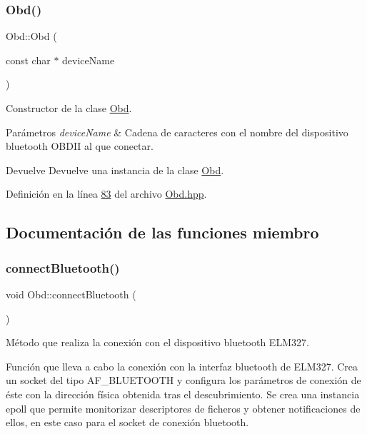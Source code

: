 \subsubsection{\texorpdfstring{Obd()}{Obd()}}
{\footnotesize\ttfamily Obd\+::\+Obd (\begin{DoxyParamCaption}\item[{const char $\ast$}]{device\+Name }\end{DoxyParamCaption})\hspace{0.3cm}{\ttfamily [inline]}}



Constructor de la clase \hyperlink{classObd}{Obd}. 


\begin{DoxyParams}{Parámetros}
{\em device\+Name} & Cadena de caracteres con el nombre del dispositivo bluetooth O\+B\+D\+II al que conectar. \\
\hline
\end{DoxyParams}
\begin{DoxyReturn}{Devuelve}
Devuelve una instancia de la clase \hyperlink{classObd}{Obd}. 
\end{DoxyReturn}


Definición en la línea \hyperlink{Obd_8hpp_source_l00083}{83} del archivo \hyperlink{Obd_8hpp_source}{Obd.\+hpp}.



\subsection{Documentación de las funciones miembro}
\mbox{\label{classObd_a104ccc3f2e0a4a103ae4cd1daa2f64d8}} 
\subsubsection{\texorpdfstring{connect\+Bluetooth()}{connectBluetooth()}}
{\footnotesize\ttfamily void Obd\+::connect\+Bluetooth (\begin{DoxyParamCaption}{ }\end{DoxyParamCaption})\hspace{0.3cm}{\ttfamily [inline]}}



Método que realiza la conexión con el dispositivo bluetooth E\+L\+M327. 

Función que lleva a cabo la conexión con la interfaz bluetooth de E\+L\+M327. Crea un socket del tipo A\+F\+\_\+\+B\+L\+U\+E\+T\+O\+O\+TH y configura los parámetros de conexión de éste con la dirección física obtenida tras el descubrimiento. Se crea una instancia epoll que permite monitorizar descriptores de ficheros y obtener notificaciones de ellos, en este caso para el socket de conexión bluetooth. 

